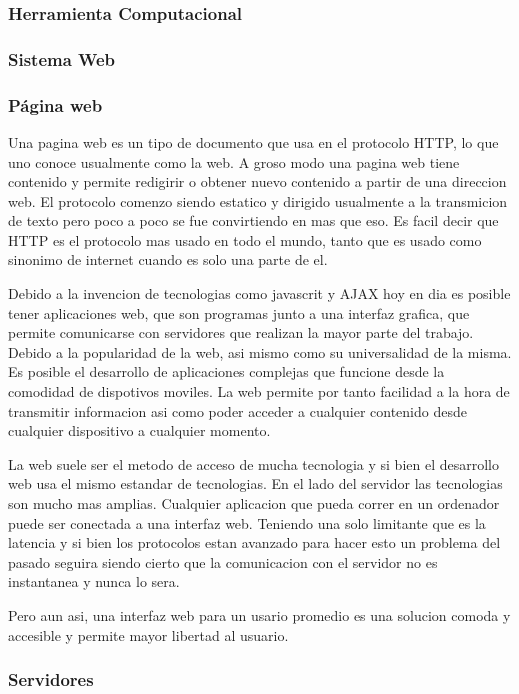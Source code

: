 \subsubsection{Herramienta Computacional}

\subsubsection{Sistema Web}

\subsubsection*{Página web}

Una pagina web es un tipo de documento que usa en el protocolo HTTP, lo que uno
conoce usualmente como la web. A groso modo una pagina web tiene contenido y
permite redigirir o obtener nuevo contenido a partir de una direccion web. El
protocolo comenzo siendo estatico y dirigido usualmente a la transmicion de
texto pero poco a poco se fue convirtiendo en mas que eso. Es facil decir que
HTTP es el protocolo mas usado en todo el mundo, tanto que es usado como
sinonimo de internet cuando es solo una parte de el.

Debido a la invencion de tecnologias como javascrit y AJAX hoy en dia es
posible tener aplicaciones web, que son programas junto a una interfaz grafica,
que permite comunicarse con servidores que realizan la mayor parte del trabajo.
Debido a la popularidad de la web, asi mismo como su universalidad de la
misma. Es posible el desarrollo de aplicaciones complejas que funcione desde la
comodidad de dispotivos moviles. La web permite por tanto facilidad a la hora
de transmitir informacion asi como poder acceder a cualquier contenido desde
cualquier dispositivo a cualquier momento.

La web suele ser el metodo de acceso de mucha tecnologia y si bien el
desarrollo web usa el mismo estandar de tecnologias. En el lado del servidor
las tecnologias son mucho mas amplias. Cualquier aplicacion que pueda correr
en un ordenador puede ser conectada a una interfaz web. Teniendo una solo
limitante que es la latencia y si bien los protocolos estan avanzado para hacer
esto un problema del pasado seguira siendo cierto que la comunicacion con el
servidor no es instantanea y nunca lo sera.

Pero aun asi, una interfaz web para un usario promedio es una solucion comoda y
accesible y permite mayor libertad al usuario.

\subsubsection*{Servidores}

